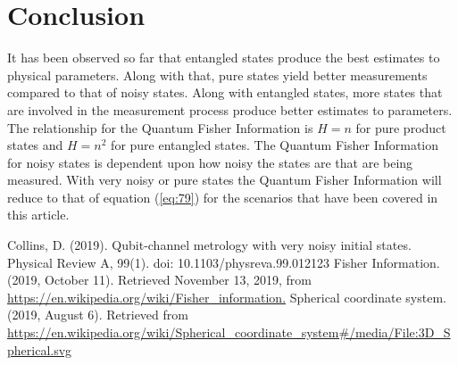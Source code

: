 \documentclass[twocolumn]{article}
\begin{document}
\section*{Conclusion}
It has been observed so far that entangled states produce the best estimates to physical parameters. Along with that, pure states yield better measurements compared to that of noisy states. Along with entangled states, more states that are involved in the measurement process produce better estimates to parameters. The relationship for the Quantum Fisher Information is $H=n$ for pure product states and $H=n^2$ for pure entangled states. The Quantum Fisher Information for noisy states is dependent upon how noisy the states are that are being measured. With very noisy or pure states the Quantum Fisher Information will reduce to that of equation (\ref{eq:79}) for the scenarios that have been covered in this article.
\newpage
\begin{thebibliography}{99}
Collins, D. (2019). Qubit-channel metrology with very noisy initial states. Physical Review A, 99(1). doi: 10.1103/physreva.99.012123
Fisher Information. (2019, October 11). Retrieved November 13, 2019, from \url{https://en.wikipedia.org/wiki/Fisher_information.}
Spherical coordinate system. (2019, August 6). Retrieved from \url{https://en.wikipedia.org/wiki/Spherical_coordinate_system#/media/File:3D_Spherical.svg}
\end{thebibliography}
\end{document}

